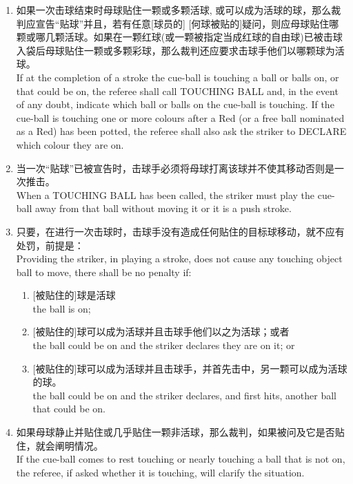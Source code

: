 \begin{enumerate}[label=(\alph*)]
    \item 如果一次击球结束时母球贴住一颗或多颗活球, 或可以成为活球的球，那么裁判应宣告“贴球”并且，若有任意[球员的] [何球被贴的]疑问，则应\indicate{}母球贴住哪颗或哪几颗活球。如果在一颗红球(或一颗被指定当成红球的自由球)已被击球入袋后母球贴住一颗或多颗彩球，那么裁判还应要求击球手\declare{}他们以哪颗球为活球。\\
    If at the completion of a stroke the cue-ball is touching a ball or balls on, or that could be on, the referee shall call TOUCHING BALL and, in the event of any doubt, indicate which ball or balls on the cue-ball is touching. If the cue-ball is touching one or more colours after a Red (or a free ball nominated as a Red) has been potted, the referee shall also ask the striker to DECLARE which colour they are on.
    \item 当一次“贴球”已被宣告时，击球手必须将母球打离该球并不使其移动否则是一次推击。\\
    When a TOUCHING BALL has been called, the striker must play the cue-ball away from that ball without moving it or it is a push stroke.
    \item 只要，在进行一次击球时，击球手没有造成任何贴住的目标球移动，就不应有处罚，前提是：\\
    Providing the striker, in playing a stroke, does not cause any touching object ball to move, there shall be no penalty if:
    \begin{enumerate}[label=(\roman*)]
        \item ${}$[被贴住的]球是活球\\
        the ball is on;
        \item ${}$[被贴住的]球可以成为活球并且击球手\declare{}他们以之为活球；或者\\
        the ball could be on and the striker declares they are on it; or
        \item ${}$[被贴住的]球可以成为活球并且击球手\declare{}，并首先击中，另一颗可以成为活球的球。\\
        the ball could be on and the striker declares, and first hits, another ball that could be on.
    \end{enumerate}
    \item 如果母球静止并贴住或几乎贴住一颗非活球，那么裁判，如果被问及它是否贴住，就会阐明情况。\\
    If the cue-ball comes to rest touching or nearly touching a ball that is not on, the referee, if asked whether it is touching, will clarify the situation.

\end{enumerate}

